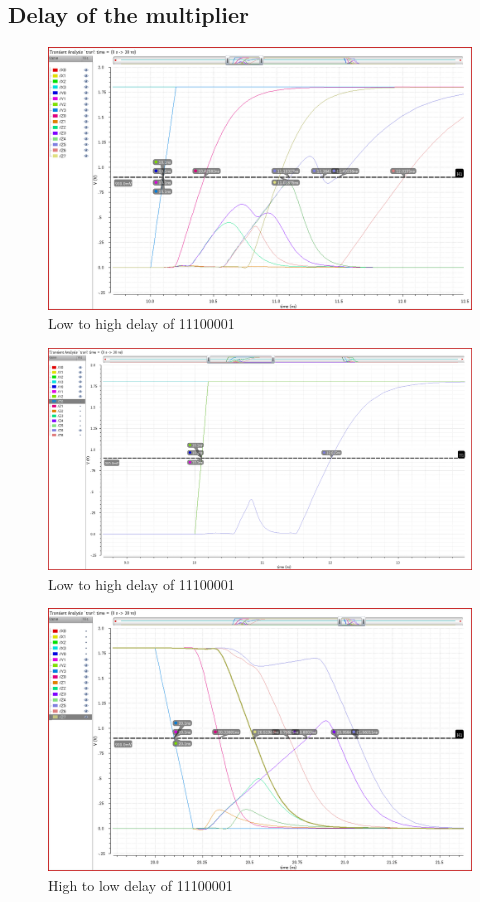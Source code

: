 \documentclass[conference]{IEEEtran}
\begin{document}
\subsection{Delay of the multiplier}


\begin{figure}[h!]
    \centering
    \includegraphics[width=0.9\linewidth]{mul_11100001_up_all.png}
    \caption{Low to high delay of 11100001}
\end{figure}

\begin{figure}[h!]
    \centering
    \includegraphics[width=0.9\linewidth]{mul_11100001_up_max.png}
    \caption{Low to high delay of 11100001}
\end{figure}

\begin{figure}[h!]
    \centering
    \includegraphics[width=0.9\linewidth]{mul_11100001_down_all.png}
    \caption{High to low delay of 11100001}
\end{figure}
\end{document}
